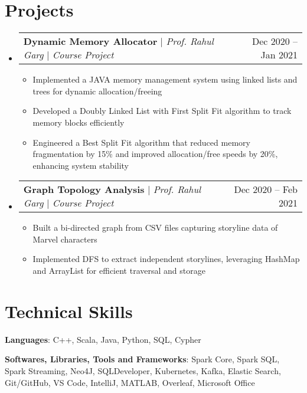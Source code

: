 \documentclass[letterpaper,11pt]{article}
\makeatletter
\newcommand{\resumeItem}[1]{
  \item\small{
    {#1 \vspace{-2pt}}
  }
}
\newcommand{\resumeProjectHeading}[2]{
    \item
    \begin{tabular*}{0.97\textwidth}{l@{\extracolsep{\fill}}r}
      \small#1 & #2 \\
    \end{tabular*}\vspace{-7pt}
}
\newcommand{\resumeSubHeadingListStart}{\begin{itemize}[leftmargin=0.15in, label={}]}
\newcommand{\resumeItemListStart}{\begin{itemize}}
\newcommand{\resumeItemListEnd}{\end{itemize}\vspace{-5pt}}
\makeatother
\begin{document}
\section{Projects}
    \resumeSubHeadingListStart
    
         \resumeProjectHeading
         {\textbf{Dynamic Memory Allocator} $|$ \emph{Prof. Rahul Garg} $|$ \emph{Course Project}}{Dec 2020 -- Jan 2021}
          \resumeItemListStart
            \resumeItem{Implemented a JAVA memory management system using linked lists and trees for dynamic allocation/freeing}
            \resumeItem{Developed a Doubly Linked List with First Split Fit algorithm to track memory blocks efficiently}
            \resumeItem{Engineered a Best Split Fit algorithm that reduced memory fragmentation by 15\% and improved allocation/free speeds by 20\%, enhancing system stability}
          \resumeItemListEnd
      \resumeProjectHeading
          {\textbf{ Graph Topology Analysis} $|$ \emph{Prof. Rahul Garg} $|$ \emph{Course Project}}{Dec 2020 -- Feb 2021}
          \resumeItemListStart
            \resumeItem{Built a bi-directed graph from CSV files capturing storyline data of Marvel characters}
            \resumeItem{Implemented DFS to extract independent storylines, leveraging HashMap and ArrayList for efficient traversal and storage}
                \resumeItemListEnd
          \resumeItemListEnd
    


\section{Technical Skills}
 \begin{itemize}[leftmargin=0.15in, label={}]
    \small{\item{
     \textbf{Languages}{: C++, Scala, Java, Python, SQL, Cypher} \\ \vspace{3pt}
 
     \textbf{Softwares, Libraries, Tools and Frameworks}{: Spark Core, Spark SQL, Spark Streaming, Neo4J, SQLDeveloper, Kubernetes, Kafka, Elastic Search, Git/GitHub, VS Code, IntelliJ, MATLAB, Overleaf, Microsoft Office}

    }}
 \end{itemize}



  
  
\end{document}
